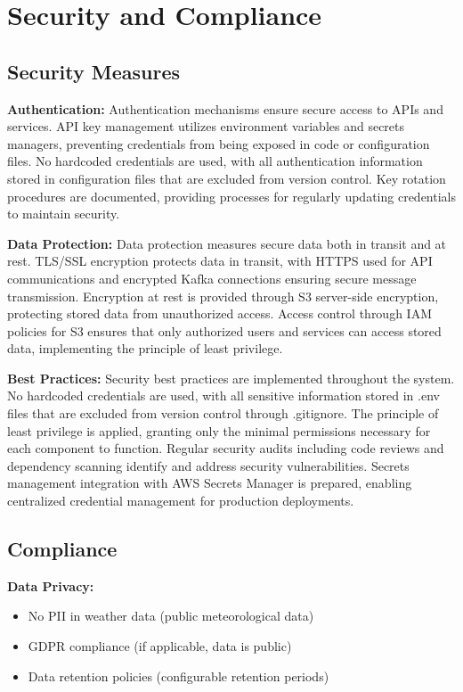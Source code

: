 \documentclass[12pt,a4paper]{article}
\begin{document}
\newpage
\section{Security and Compliance}

\subsection{Security Measures}

\textbf{Authentication:} Authentication mechanisms ensure secure access to APIs and services. API key management utilizes environment variables and secrets managers, preventing credentials from being exposed in code or configuration files. No hardcoded credentials are used, with all authentication information stored in configuration files that are excluded from version control. Key rotation procedures are documented, providing processes for regularly updating credentials to maintain security.

\textbf{Data Protection:} Data protection measures secure data both in transit and at rest. TLS/SSL encryption protects data in transit, with HTTPS used for API communications and encrypted Kafka connections ensuring secure message transmission. Encryption at rest is provided through S3 server-side encryption, protecting stored data from unauthorized access. Access control through IAM policies for S3 ensures that only authorized users and services can access stored data, implementing the principle of least privilege.

\textbf{Best Practices:} Security best practices are implemented throughout the system. No hardcoded credentials are used, with all sensitive information stored in .env files that are excluded from version control through .gitignore. The principle of least privilege is applied, granting only the minimal permissions necessary for each component to function. Regular security audits including code reviews and dependency scanning identify and address security vulnerabilities. Secrets management integration with AWS Secrets Manager is prepared, enabling centralized credential management for production deployments.

\subsection{Compliance}

\textbf{Data Privacy:}
\begin{itemize}
    \item No PII in weather data (public meteorological data)
    \item GDPR compliance (if applicable, data is public)
    \item Data retention policies (configurable retention periods)
\end{itemize}
\end{document}
